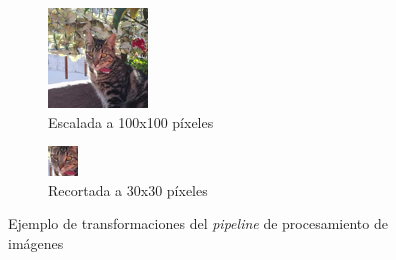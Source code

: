 \documentclass[11pt]{article}
\newcommand{\english}[1]{\textit{#1}}
\begin{document}
\begin{figure}[h]
    \begin{subfigure}[b]{0.3\textwidth}
        \centering
        \includegraphics[width=\textwidth]{resources/distributed_systems/pipeline_images/scaled.png}
        \caption{Escalada a 100x100 píxeles}
    \end{subfigure}
    \hspace{10mm}
    \begin{subfigure}[b]{0.3\textwidth}
        \centering
        \includegraphics[width=\textwidth]{resources/distributed_systems/pipeline_images/cropped.png}
        \caption{Recortada a 30x30 píxeles}
    \end{subfigure}
    \caption{Ejemplo de transformaciones del \english{pipeline} de procesamiento de imágenes}
    \label{fig:sis_dist:ip_example}
\end{figure}
\end{document}
